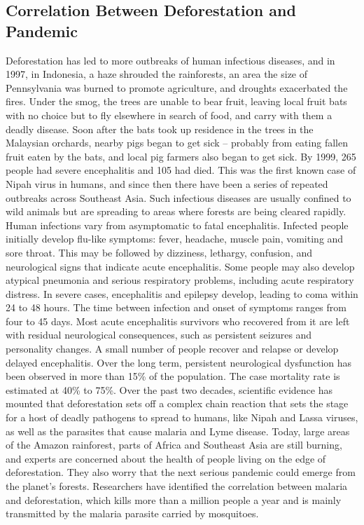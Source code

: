 \documentclass{book}\usepackage{knitr}
\begin{document}
\begin{knitrout}
\begin{kframe}
{\section{Correlation Between Deforestation and Pandemic}
Deforestation has led to more outbreaks of human infectious diseases, and in 1997, in Indonesia, a haze shrouded the rainforests, an area the size of Pennsylvania was burned to promote agriculture, and droughts exacerbated the fires. Under the smog, the trees are unable to bear fruit, leaving local fruit bats with no choice but to fly elsewhere in search of food, and carry with them a deadly disease. Soon after the bats took up residence in the trees in the Malaysian orchards, nearby pigs began to get sick -- probably from eating fallen fruit eaten by the bats, and local pig farmers also began to get sick. By 1999, 265 people had severe encephalitis and 105 had died. This was the first known case of Nipah virus in humans, and since then there have been a series of repeated outbreaks across Southeast Asia. Such infectious diseases are usually confined to wild animals but are spreading to areas where forests are being cleared rapidly. Human infections vary from asymptomatic to fatal encephalitis. Infected people initially develop flu-like symptoms: fever, headache, muscle pain, vomiting and sore throat. This may be followed by dizziness, lethargy, confusion, and neurological signs that indicate acute encephalitis. Some people may also develop atypical pneumonia and serious respiratory problems, including acute respiratory distress. In severe cases, encephalitis and epilepsy develop, leading to coma within 24 to 48 hours. The time between infection and onset of symptoms ranges from four to 45 days. Most acute encephalitis survivors who recovered from it are left with residual neurological consequences, such as persistent seizures and personality changes. A small number of people recover and relapse or develop delayed encephalitis. Over the long term, persistent neurological dysfunction has been observed in more than 15\% of the population. The case mortality rate is estimated at 40\% to 75\%. Over the past two decades, scientific evidence has mounted that deforestation sets off a complex chain reaction that sets the stage for a host of deadly pathogens to spread to humans, like Nipah and Lassa viruses, as well as the parasites that cause malaria and Lyme disease. Today, large areas of the Amazon rainforest, parts of Africa and Southeast Asia are still burning, and experts are concerned about the health of people living on the edge of deforestation. They also worry that the next serious pandemic could emerge from the planet's forests. Researchers have identified the correlation between malaria and deforestation, which kills more than a million people a year and is mainly transmitted by the malaria parasite carried by mosquitoes.

}
\end{kframe}
\end{knitrout}
\end{document}
